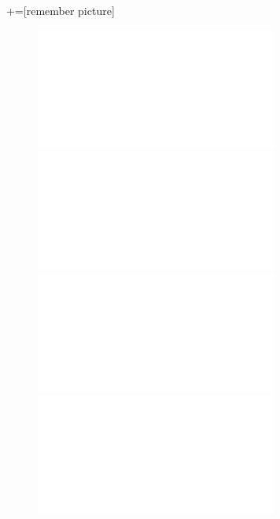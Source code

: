 \documentclass[9pt,xcolor=svgnames]{beamer}
\begin{document}
+=[remember picture]
\everymath{\displaystyle}
\subtitle{El avance del proyecto}


\begin{frame}
 \thispagestyle{empty}
 
 \begin{figure}[t]
  \centering
  \includegraphics<1>[scale=0.7]{../Imagenes/logo_1.pdf}
  \includegraphics<2>[scale=0.7]{../Imagenes/logo_2.pdf}
  \includegraphics<3>[scale=0.7]{../Imagenes/logo_3.pdf}
  \includegraphics<4>[scale=0.7]{../Imagenes/logo_4.pdf}
 \end{figure}
\end{frame}




\begin{frame}
 \titlepage
\end{frame}

\normalsize
\end{document}
